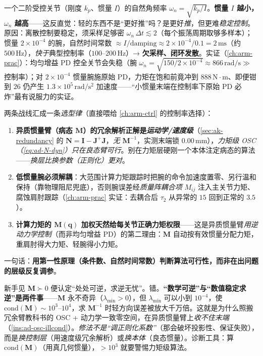 \begin{insight}[自然频率 $\omega_n=\sqrt{k_p/I}$ 判稳：轻腕为何\emph{更难}控]
\label{ins:ad-wn}
一个二阶受控关节（刚度 $k_p$、惯量 $I$）的自然角频率 $\omega_n=\sqrt{k_p/I}$。\textbf{惯量 $I$ 越小，$\omega_n$ 越高}——这反直觉：轻的东西不是“更好推”吗？是更好\emph{推}，但更难\emph{稳定控制}。原因：离散控制要稳定，须采样足够密 $\omega_n\,\Delta t\lesssim2$（每个振荡周期取够多样本）；惯量 $2\times10^{-4}$ 的腕，自然时间常数 $\approx I/\text{damping}\approx2\times10^{-4}/0.1=2\,\mathrm{ms}$（约 $500\,\mathrm{Hz}$），\emph{快于}典型控制率（$100$--$200\,\mathrm{Hz}$）→ \textbf{欠采样、闭环发散}。实证（\cref{ch:arm-prac}）：均匀增益 PD 控全关节会失稳（腕 $\omega_n=\sqrt{150/2\times10^{-4}}\approx866\,\mathrm{rad/s}\gg$ 控制率）；对 $2\times10^{-4}$ 惯量腕施原始 PD，力矩在饱和前竟冲到 $888\,\mathrm{N\!\cdot\! m}$、即便钳到 $26$ 仍产生 $1.3\times10^5\,\mathrm{rad/s^2}$ 加速度——“小惯量末端在控制率下原始 PD 必炸”最有说服力的实证。
\end{insight}

\begin{insight}
\label{ins:ad-selection-law}
两条战线汇成一条\emph{选型律}（直接喂给 \cref{ch:arm-ctrl} 的控制率选择）：
\begin{enumerate}
  \item \textbf{异质惯量臂（病态 $\mathbf{M}$）的冗余解析正解是\emph{运动学/速度级}}（\cref{sec:ak-redundancy} 的 $\mathbf{N}=\mathbf{I}-\mathbf{J}^+\mathbf{J}$，\emph{无} $\mathbf{M}^{-1}$，实测末端锁 $0.00\,\mathrm{mm}$），\emph{力矩级 OSC（\cref{eq:ad-N-dyn}）只在良态臂可行}。别在力矩层硬刚一个本体注定病态的算法——\emph{换层比换参数（正则化）更对}。
  \item \textbf{低惯量腕必须解耦}：大范围计算力矩跟踪时把腕的命令加速度置零、另行温和保持（靠物理阻尼兜底），否则腕误差经\emph{质量阵耦合项} $M_{ij}$ 注入主关节力矩、腐蚀肩肘跟踪（\cref{ch:arm-prac} 实证：去耦合后 $\tau_2$ 从异常的 $15$ 回到正常的 $3.5$）。
  \item \textbf{计算力矩的 $\mathbf{M}(\mathbf{q})$ 加权天然给每关节正确力矩权限}——这是异质惯量臂\emph{用逆动力学控制}（而非均匀增益 PD）的第二理由：$\mathbf{M}$ 自动按有效惯量分配力矩，重肩肘得大力矩、轻腕得小力矩。
\end{enumerate}
一句话：\textbf{用第一性原理（条件数、自然时间常数）判断算法可行性，而非在出问题的层级反复调参}。
\end{insight}

\begin{pitfall}
\label{pit:ad-spd-not-safe}
新手见 $\mathbf{M}\succ0$ 便认定“处处可逆，求逆无忧”。错。\textbf{“数学可逆”与“数值稳定求逆”是两件事}——$\mathbf{M}$ 永不奇异（$\lambda_{\min}>0$），但 $\lambda_{\min}$ 可以小到 $10^{-4}$，使 $\mathrm{cond}(\mathbf{M})\sim10^3$--$10^4$，求 $\mathbf{M}^{-1}$ 时轻方向误差被放大千万倍。这就是为什么照搬冗余臂教科书的 OSC + 动力学一致零空间，在异质惯量臂上\emph{收不住末端}（\cref{ins:ad-osc-illcond}）。\emph{修法不是“调正则化系数”}（那会破坏投影性、保证失败），而是\emph{换控制层}（用速度级冗余解析）或\emph{换本体}（良态惯量）。诊断工具：算 $\mathrm{cond}(\mathbf{M})$（用真几何惯量），$>10^3$ 就要警惕力矩级算法。
\end{pitfall}

